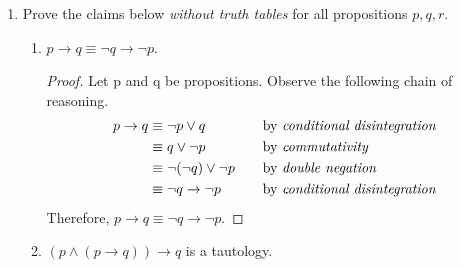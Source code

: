 \documentclass{article}
\begin{document}
\begin {enumerate}
        \textcolor{red}{From (2) to (3) the proof incorrectly uses associativity}. First, it incorrectly distributes $\neg$ and then it gets rid of the parenthesis, two things that should not happen.
\pagebreak  
    \item
        Prove the claims below \emph{without truth tables} for all propositions $p, q, r$.

    \begin{enumerate}
      \item
        $p \rightarrow q \equiv \neg q \rightarrow \neg p$.
        
        \vspace{2ex}
        \begin{proof}
        Let p and q be propositions. Observe the following chain of reasoning.
        \begin{align*}
          p \rightarrow q 
            &\equiv \neg p \lor q
              &\quad
              &\text{by \emph{conditional disintegration}} 
              \\
            &\equiv q \lor \neg p
              &\quad
              &\text{by \emph{commutativity}} 
              \\
            &\equiv \neg (\neg q) \lor \neg p
              &\quad
              &\text{by \emph{double negation}} 
              \\
            &\equiv \neg q \rightarrow \neg p
              &\quad
              &\text{by \emph{conditional disintegration}} 
        \end{align*}
        Therefore, $p \rightarrow q \equiv \neg q \rightarrow \neg p$.
        \end{proof}
\hrulefill
 
      \item
        $(p \land (p \rightarrow q)) \rightarrow q$ is a tautology.


\end{enumerate}
\end{enumerate}
\end{document}
